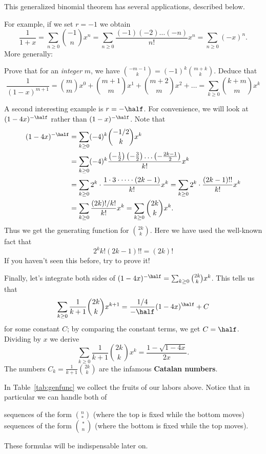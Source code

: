 \documentclass[11pt]{scrartcl}
\begin{document}
This generalized binomial theorem has several applications, described below.
\begin{itemize}
\ii For example, if we set $r = -1$ we obtain
\[
  \frac{1}{1+x}
  = \sum_{n \ge 0} \binom{-1}{n} x^n
  = \sum_{n \ge 0}
  \frac{(-1) (-2) \dots (-n)}{n!} x^n
  = \sum_{n \ge 0} (-x)^n.
\]
\ii More generally:
\begin{exercise}
  Prove that for an \emph{integer} $m$, we have
  $\binom{-m-1}{k} = (-1)^k \binom{m+k}{k}$.
  Deduce that
  \[
    \frac{1}{(1-x)^{m+1}}
    = \binom{m}{m} x^0 + \binom{m+1}{m} x^1 + \binom{m+2}{m} x^2 + \dots
    = \sum_{k \ge 0} \binom{k+m}{m} x^k
  \]
\end{exercise}
\ii A second interesting example is $r = -\half$.
For convenience, we will look at $(1-4x)^{-\half}$
rather than $(1-x)^{-\half}$.
Note that
\begin{align*}
  (1-4x)^{-\half}
  &= \sum_{k \ge 0} (-4)^k \binom{-1/2}{k} x^k \\
  &= \sum_{k \ge 0} (-4)^k \frac{\left( -\frac12 \right)\left( -\frac32 \right)\dots
    \left( -\frac{2k-1}{2} \right)}{k!} x^k \\
  &= \sum_{k \ge 0} 2^k \cdot \frac{1 \cdot 3 \cdot \dots \cdot (2k-1)}{k!} x^k
    = \sum_{k \ge 0} 2^k \cdot \frac{(2k-1)!!}{k!} x^k \\
  &= \sum_{k \ge 0} \frac{(2k)!/k!}{k!} x^k
    = \sum_{k \ge 0} \binom{2k}{k} x^k.
\end{align*}
Thus we get the generating function for $\binom{2k}{k}$.
Here we have used the well-known fact that
\[ 2^{k} k! (2k-1)!! = (2k)! \]
If you haven't seen this before, try to prove it!

\ii Finally, let's integrate both sides of
$(1-4x)^{-\half} = \sum_{k \ge 0} \binom{2k}{k} x^k$.
This tells us that
\[ \sum_{k \ge 0} \frac{1}{k+1} \binom{2k}{k} x^{k+1}
  = \frac{1/4}{-\half}(1-4x)^\half + C \]
for some constant $C$; by comparing the constant terms, we get $C = \half$.
Dividing by $x$ we derive
\[ \sum_{k \ge 0} \frac{1}{k+1} \binom{2k}{k} x^{k}
  = \frac{1 - \sqrt{1-4x}}{2x}. \]
The numbers $C_k = \frac{1}{k+1} \binom{2k}{k}$ are the
infamous \textbf{Catalan numbers}.
\end{itemize}

In Table~\ref{tab:genfunc} we collect the fruits of our labors above.
Notice that in particular we can handle both of
\begin{itemize}
  \ii sequences of the form $\binom{n}{\ast}$
  (where the top is fixed while the bottom moves)
  \ii sequences of the form $\binom{\ast}{n}$
  (where the bottom is fixed while the top moves).
\end{itemize}
These formulas will be indispensable later on.
\end{document}
